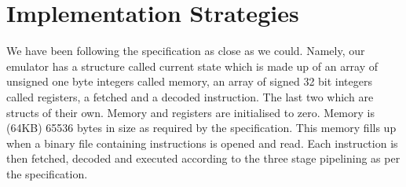 \documentclass[11pt]{article}
\begin{document}

\section{Implementation Strategies}


We have been following the specification as close as we could. Namely, our emulator has a structure called current state which is made up of an array of unsigned one byte integers called memory, an array of signed 32 bit integers called registers, a fetched and a decoded instruction. The last two which are structs of their own. Memory and registers are initialised to zero. Memory is (64KB) 65536 bytes in size as required by the specification. This memory fills up when a binary file containing instructions is opened and read. Each instruction is then fetched, decoded and executed according to the three stage pipelining as per the specification.  


\end{document}
